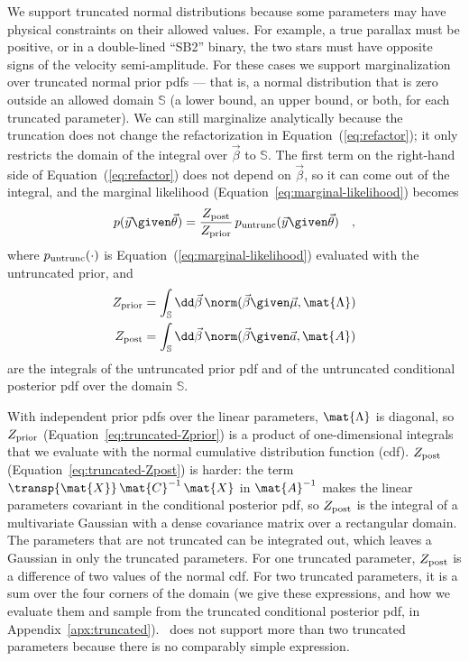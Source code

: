 \documentclass[twocolumn]{AASTeX7/aastex701}
\newcommand{\harv}{\package{harv}}
\begin{document}
We support truncated normal distributions because some parameters may have physical
constraints on their allowed values.
For example, a true parallax must be positive, or in a double-lined ``SB2'' binary, the
two stars must have opposite signs of the velocity semi-amplitude.
For these cases we support marginalization over truncated normal prior pdfs --- that is,
a normal distribution that is zero outside an allowed domain $\mathbb{S}$ (a lower
bound, an upper bound, or both, for each truncated parameter).
We can still marginalize analytically because the truncation does not change the
refactorization in Equation~(\ref{eq:refactor}); it only restricts the domain of the
integral over $\vec{\beta}$ to $\mathbb{S}$.
The first term on the right-hand side of Equation~(\ref{eq:refactor}) does not depend on
$\vec{\beta}$, so it can come out of the integral, and the marginal likelihood
(Equation~\ref{eq:marginal-likelihood}) becomes
\begin{equation}
  p(\vec{y} \given \vec{\theta}) =
    \frac{Z_{\rm post}}{Z_{\rm prior}} \,
    p_{\rm untrunc}(\vec{y} \given \vec{\theta})
  \quad ,
  \label{eq:truncated}
\end{equation}
where $p_{\rm untrunc}(\cdot)$ is Equation~(\ref{eq:marginal-likelihood}) evaluated with
the untruncated prior, and
\begin{align}
  Z_{\rm prior} &= \int_\mathbb{S} \dd\vec{\beta} \,
    \norm(\vec{\beta} \given \vec{\mu}, \mat{\Lambda})
    \label{eq:truncated-Zprior} \\
  Z_{\rm post} &= \int_\mathbb{S} \dd\vec{\beta} \,
    \norm(\vec{\beta} \given \vec{a}, \mat{A})
  \label{eq:truncated-Zpost}
\end{align}
are the integrals of the untruncated prior pdf and of the untruncated conditional
posterior pdf over the domain $\mathbb{S}$.

With independent prior pdfs over the linear parameters, $\mat{\Lambda}$ is diagonal, so
$Z_{\rm prior}$ (Equation~\ref{eq:truncated-Zprior}) is a product of one-dimensional
integrals that we evaluate with the normal cumulative distribution function (cdf).
$Z_{\rm post}$ (Equation~\ref{eq:truncated-Zpost}) is harder: the term
$\transp{\mat{X}}\,\mat{C}^{-1}\,\mat{X}$ in $\mat{A}^{-1}$ makes the linear parameters
covariant in the conditional posterior pdf, so $Z_{\rm post}$ is the integral of a
multivariate Gaussian with a dense covariance matrix over a rectangular domain.
The parameters that are not truncated can be integrated out, which leaves a Gaussian in
only the truncated parameters.
For one truncated parameter, $Z_{\rm post}$ is a difference of two values of the normal
cdf.
For two truncated parameters, it is a sum over the four corners of the domain (we give
these expressions, and how we evaluate them and sample from the truncated conditional
posterior pdf, in Appendix~\ref{apx:truncated}).
\harv\ does not support more than two truncated parameters because there is no
comparably simple expression.
\end{document}
